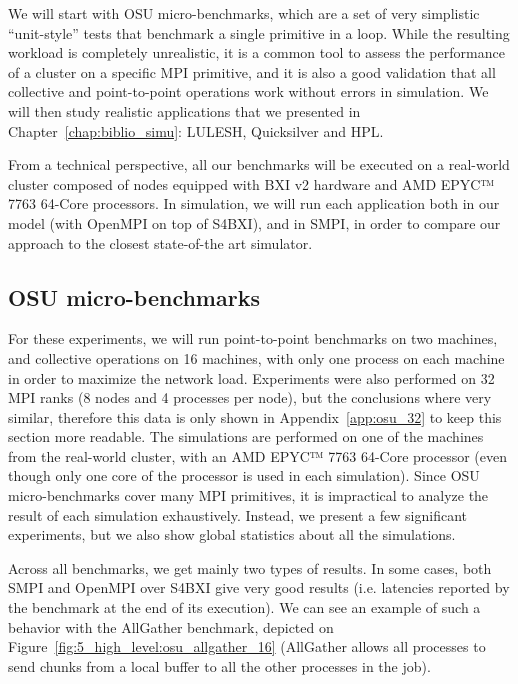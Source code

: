 We will start with OSU micro-benchmarks, which are a set of
very simplistic ``unit-style'' tests that benchmark a single primitive in a
loop. While the resulting workload is completely unrealistic, it is a common
tool to assess the performance of a cluster on a specific MPI primitive, and it
is also a good validation that all collective and point-to-point operations work
without errors in simulation. We will then study realistic applications that we
presented in Chapter~\ref{chap:biblio_simu}: LULESH, Quicksilver and HPL.

From a technical perspective, all our benchmarks will be executed on a
real-world cluster composed of nodes equipped with BXI v2 hardware and AMD EPYC™
7763 64-Core processors. In simulation, we will run each application both in our
model (with OpenMPI on top of S4BXI), and in SMPI, in order to compare our
approach to the closest state-of-the art simulator.

\subsection{OSU micro-benchmarks}
\label{subsubsec:5_high_level:osu_results}

For these experiments, we will run point-to-point benchmarks on two machines,
and collective operations on 16 machines, with only one process on each machine
in order to maximize the network load. Experiments were also performed on 32 MPI
ranks (8 nodes and 4 processes per node), but the conclusions where very
similar, therefore this data is only shown in Appendix~\ref{app:osu_32} to keep
this section more readable. The simulations are performed on one of the machines
from the real-world cluster, with an AMD EPYC™ 7763 64-Core processor (even
though only one core of the processor is used in each simulation). Since OSU
micro-benchmarks cover many MPI primitives, it is impractical to analyze the
result of each simulation exhaustively. Instead, we present a few significant
experiments, but we also show global statistics about all the simulations.

Across all benchmarks, we get mainly two types of results. In some cases, both
SMPI and OpenMPI over S4BXI give very good results (i.e. latencies reported by
the benchmark at the end of its execution). We can see  an example of such a
behavior with the AllGather benchmark, depicted on
Figure~\ref{fig:5_high_level:osu_allgather_16} (AllGather allows all processes
to send chunks from a local buffer to all the other processes in the job).

